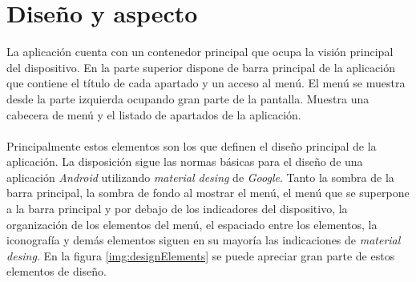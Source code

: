 \documentclass[../PFC.tex]{subfiles}
\begin{document}
\section{Diseño y aspecto}
\label{App:Diseño y aspecto}

La aplicación cuenta con un contenedor principal que ocupa la visión principal del dispositivo. En la parte superior dispone de barra principal de la aplicación que contiene el título de cada apartado y un acceso al menú. El menú se muestra desde la parte izquierda ocupando gran parte de la pantalla. Muestra una cabecera de menú y el listado de apartados de la aplicación.
\\\\
Principalmente estos elementos son los que definen el diseño principal de la aplicación. La disposición sigue las normas básicas para el diseño de una aplicación \textit{Android} utilizando \textit{material desing} de \textit{Google}\cite{materialDesign}. Tanto la sombra de la barra principal, la sombra de fondo al mostrar el menú, el menú que se superpone a la barra principal y por debajo de los indicadores del dispositivo, la organización de los elementos del menú, el espaciado entre los elementos, la iconografía y demás elementos siguen en su mayoría las indicaciones de \textit{material desing}. En la figura \ref{img:designElements} se puede apreciar gran parte de estos elementos de diseño.
\end{document}
